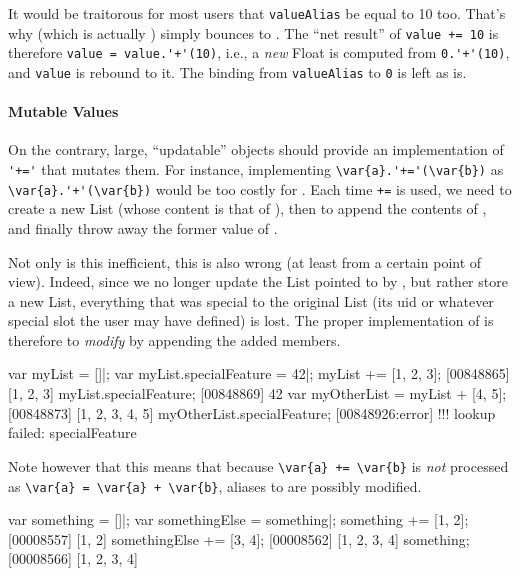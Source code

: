 It would be traitorous for most users that \lstinline|valueAlias| be equal
to 10 too.  That's why  (which is actually
) simply bounces to .  The ``net
result'' of \lstinline|value += 10| is therefore
\lstinline|value = value.'+'(10)|, i.e., a \emph{new} Float is computed from
\lstinline|0.'+'(10)|, and \lstinline|value| is rebound to it.  The binding
from \lstinline|valueAlias| to \lstinline|0| is left as is.

\paragraph{Mutable Values}
On the contrary, large, ``updatable'' objects should provide an
implementation of \lstinline|'+='| that mutates them.  For instance,
implementing \lstinline|\var{a}.'+='(\var{b})| as
\lstinline|\var{a}.'+'(\var{b})| would be too costly for
.  Each time \lstinline|+=| is used, we need to create a
new List (whose content is that of ), then to append the contents of
, and finally throw away the former value of .

Not only is this inefficient, this is also wrong (at least from a certain
point of view).  Indeed, since we no longer update the List pointed to by
, but rather store a new List, everything that was special to the
original List (its uid or whatever special slot the user may have defined)
is lost.  The proper implementation of  is therefore to
\emph{modify} \this by appending the added members.

\begin{urbiscript}
var myList = []|;
var myList.specialFeature = 42|;
myList += [1, 2, 3];
[00848865] [1, 2, 3]
myList.specialFeature;
[00848869] 42
var myOtherList = myList + [4, 5];
[00848873] [1, 2, 3, 4, 5]
myOtherList.specialFeature;
[00848926:error] !!! lookup failed: specialFeature
\end{urbiscript}

Note however that this means that because \lstinline|\var{a} += \var{b}| is
\emph{not} processed as \lstinline|\var{a} = \var{a} + \var{b}|, aliases to
 are possibly modified.

\begin{urbiscript}
var something = []|;
var somethingElse = something|;
something += [1, 2];
[00008557] [1, 2]
somethingElse += [3, 4];
[00008562] [1, 2, 3, 4]
something;
[00008566] [1, 2, 3, 4]
\end{urbiscript}

